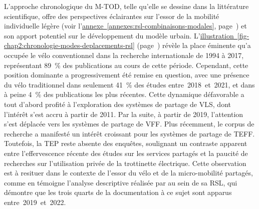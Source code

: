 \begin{refsegment}
L'approche chronologique du \acrshort{M-TOD}, telle qu'elle se dessine dans la littérature scientifique, offre des perspectives éclairantes sur l'essor de la mobilité individuelle légère (voir l'\hyperref[annexes:rsl-combinaisons-modales]{annexe~\ref{annexes:rsl-combinaisons-modales}}, page~\pageref{annexes:rsl-combinaisons-modales}) et son apport potentiel sur le développement du modèle urbain. L'\hyperref[fig-chap2:chronologie-modes-deplacements-rsl]{illustration~\ref{fig-chap2:chronologie-modes-deplacements-rsl}} (page~\pageref{fig-chap2:chronologie-modes-deplacements-rsl}) révèle la place éminente qu'a occupée le vélo conventionnel dans la recherche internationale de 1994 à 2017, représentant 89~\% des publications au cours de cette période. Cependant, cette position dominante a progressivement été remise en question, avec une présence du vélo traditionnel dans seulement 41~\% des études entre~2018~et~2021, et dans à peine 4~\% des publications les plus récentes. Cette dynamique défavorable a tout d'abord profité à l'exploration des systèmes de partage de \acrfull{VLS}, dont l'intérêt s'est accru à partir de 2011. Par la suite, à partir de 2019, l'attention s'est déplacée vers les systèmes de partage de \acrfull{VFF}. Plus récemment, le corpus de recherche a manifesté un intérêt croissant pour les systèmes de partage de \acrfull{TEFF}. Toutefois, la \acrfull{TEP} reste absente des enquêtes, soulignant un contraste apparent entre l'effervescence récente des études sur les services partagés et la paucité de recherches sur l'utilisation privée de la trottinette électrique. Cette observation est à resituer dans le contexte de l'essor du vélo et de la micro-mobilité partagés, comme en témoigne l'analyse descriptive réalisée par \textcolor{blue}{\textcite[298]{zhang_built_2023}} au sein de sa \acrshort{RSL}, qui démontre que les trois quarts de la documentation à ce sujet sont apparus entre~2019~et~2022.%


\end{refsegment}

